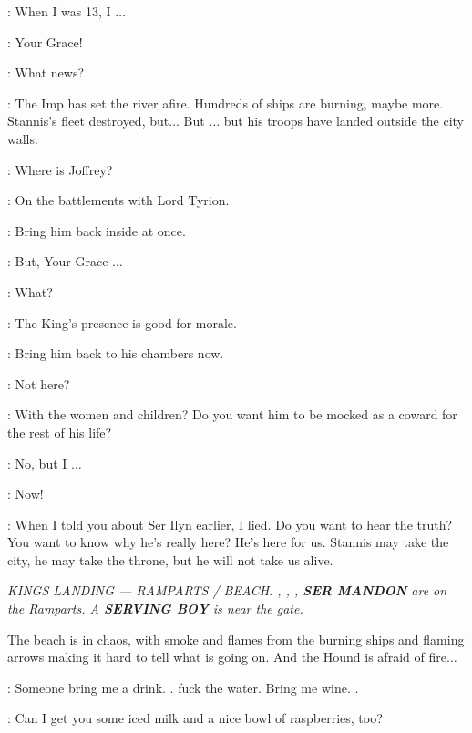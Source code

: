 \SHAE: When I was 13, I $\ldots$  


\LANCEL: Your Grace! 

\CERSEI: What news? 

\LANCEL: The Imp has set the river afire. Hundreds of ships are burning, maybe more. Stannis's fleet destroyed, but$\ldots$ But $\ldots$ but his troops have landed outside the city walls. 

\CERSEI: Where is Joffrey? 

\LANCEL: On the battlements with Lord Tyrion. 

\CERSEI: Bring him back inside at once. 

\LANCEL: But, Your Grace $\ldots$  

\CERSEI: What? 

\LANCEL: The King's presence is good for morale. 

\CERSEI: Bring him back to his chambers now. 

\LANCEL: Not here? 

\CERSEI: With the women and children? Do you want him to be mocked as a coward for the rest of his life? 

\LANCEL: No, but I $\ldots$  

\CERSEI: Now! 


\CERSEI: When I told you about Ser Ilyn earlier, I lied. Do you want to hear the truth? You want to know why he's really here? He's here for us. Stannis may take the city, he may take the throne, but he will not take us alive. 


\scene

\textit{KINGS LANDING --- RAMPARTS /
BEACH. \JOFFREY, \TYRION, \PODRICK, \textbf{SER MANDON} are on the
Ramparts. A \textbf{SERVING BOY} is near the gate.} 

\n The beach is in chaos, with smoke and flames from the burning ships
and flaming arrows making it hard to tell what is going on. And the
Hound is afraid of fire$\ldots$


\HOUND: Someone bring me a drink. . 
fuck the water.  Bring me
wine. .

\TYRION: Can I get you some iced milk and a nice bowl of raspberries, too? 

